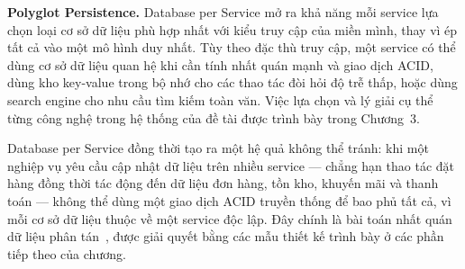 \documentclass[../DoAn.tex]{subfiles}
\begin{document}
\textbf{Polyglot Persistence.} Database per Service mở ra khả năng mỗi service lựa chọn loại
cơ sở dữ liệu phù hợp nhất với kiểu truy cập của miền mình, thay vì ép tất cả vào một mô
hình duy nhất. Tùy theo đặc thù truy cập, một service có thể dùng cơ sở dữ liệu quan hệ khi
cần tính nhất quán mạnh và giao dịch ACID, dùng kho key-value trong bộ nhớ cho các thao tác
đòi hỏi độ trễ thấp, hoặc dùng search engine cho nhu cầu tìm kiếm toàn văn. Việc lựa chọn và
lý giải cụ thể từng công nghệ trong hệ thống của đề tài được trình bày trong Chương~3.

Database per Service đồng thời tạo ra một hệ quả không thể tránh: khi một nghiệp vụ yêu cầu
cập nhật dữ liệu trên nhiều service --- chẳng hạn thao tác đặt hàng đồng thời tác động đến
dữ liệu đơn hàng, tồn kho, khuyến mãi và thanh toán --- không thể dùng một giao dịch ACID
truyền thống để bao phủ tất cả, vì mỗi cơ sở dữ liệu thuộc về một service độc lập. Đây chính
là bài toán nhất quán dữ liệu phân tán~\cite{kleppmann2017}, được giải quyết bằng các mẫu
thiết kế trình bày ở các phần tiếp theo của chương.


\end{document}
